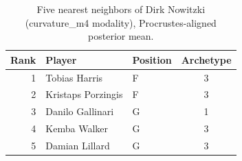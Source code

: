\begin{table}[htbp]
  \centering\small
  \begin{tabular}{rllc}
    \toprule
    Rank & Player & Position & Archetype \\
    \midrule
    1 & Tobias Harris & F & 3 \\
    2 & Kristaps Porzingis & F & 3 \\
    3 & Danilo Gallinari & G & 1 \\
    4 & Kemba Walker & G & 3 \\
    5 & Damian Lillard & G & 3 \\
    \bottomrule
  \end{tabular}
  \caption{Five nearest neighbors of Dirk Nowitzki (curvature_m4 modality), Procrustes-aligned posterior mean.}
  \label{tab:Dirk_Nowitzki_neighbors_curvature_m4}
\end{table}


